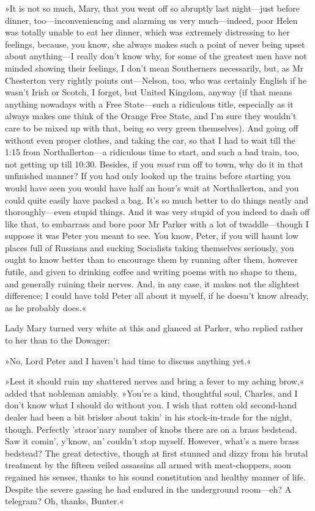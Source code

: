 »It is not so much, Mary, that you went off so abruptly last night\allowbreak---\allowbreak just before dinner, too\allowbreak---\allowbreak inconveniencing and alarming us very much\allowbreak---\allowbreak indeed, poor Helen was totally unable to eat her dinner, which was extremely distressing to her feelings, because, you know, she always makes such a point of never being upset about anything\allowbreak---\allowbreak I really don't know why, for some of the greatest men have not minded showing their feelings, I don't mean Southerners necessarily, but, as Mr  Chesterton very rightly points out\allowbreak---\allowbreak Nelson, too, who was certainly English if he wasn't Irish or Scotch, I forget, but United Kingdom, anyway (if that means anything nowadays with a Free State\allowbreak---\allowbreak such a ridiculous title, especially as it always makes one think of the Orange Free State, and I'm sure they wouldn't care to be mixed up with that, being so very green themselves). And going off without even proper clothes, and taking the car, so that I had to wait till the 1:15 from Northallerton\allowbreak---\allowbreak a ridiculous time to start, and such a bad train, too, not getting up till 10:30. Besides, if you \textit{must} run off to town, why do it in that unfinished manner? If you had only looked up the trains before starting you would have seen you would have half an hour's wait at Northallerton, and you could quite easily have packed a bag.  It's so much better to do things neatly and thoroughly\allowbreak---\allowbreak even stupid things. And it was very stupid of you indeed to dash off like that, to embarrass and bore poor Mr Parker with a lot of twaddle\allowbreak---\allowbreak though I suppose it was Peter you meant to see. You know, Peter, if you will haunt low places full of Russians and sucking Socialists taking themselves seriously, you ought to know better than to encourage them by running after them, however futile, and given to drinking coffee and writing poems with no shape to them, and generally ruining their nerves. And, in any case, it makes not the slightest difference; I could have told Peter all about it myself, if he doesn't know already, as he probably does.«

Lady Mary turned very white at this and glanced at Parker, who replied rather to her than to the Dowager:

»No, Lord Peter and I haven't had time to discuss anything yet.«

»Lest it should ruin my shattered nerves and bring a fever to my aching brow,« added that nobleman amiably. »You're a kind, thoughtful soul, Charles, and I don't know what I should do without you. I wish that rotten old second-hand dealer had been a bit brisker about takin' in his stock-in-trade for the night, though. Perfectly 'straor'nary number of knobs there are on a brass bedstead. Saw it comin', y'know, an' couldn't stop myself. However, what's a mere brass bedstead? The great detective, though at first stunned and dizzy from his brutal treatment by the fifteen veiled assassins all armed with meat-choppers, soon regained his senses, thanks to his sound constitution and healthy manner of life. Despite the severe gassing he had endured in the underground room\allowbreak---\allowbreak eh? A telegram? Oh, thanks, Bunter.«

